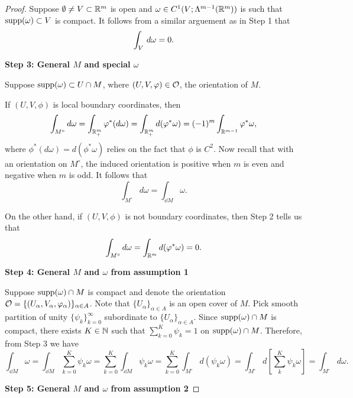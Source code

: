 \documentclass[a4paper]{article}
\renewcommand{\seqinfk}[1]{\{ #1 \}_{k=0}^\infty}
\renewcommand{\sumk}{\sum_{k=0}}
\begin{document}
\begin{proof}
  Suppose $\emptyset \neq V \subset \mathbb{R}^m$ is open and $\omega \in C^1 (V;
  \Lambda^{m-1} (\mathbb{R}^m))$ is such that $\operatorname{supp}(\omega) \subset V$ is
  compact. It follows from a similar arguement as in Step 1 that
  \[
    \int_V \, d \omega = 0.
  \]

  \textbf{Step 3: General $M$ and special $\omega$}

  Suppose $\operatorname{supp}(\omega) \subset U \cap M$, where $(U, V, \varphi) \in
  \mathcal{O}$, the orientation of $M$.

  If $(U, V, \phi)$ is local boundary coordinates, then
  \[
    \int_{M^\circ} d \omega
    = \int_{\mathbb{R}^m_+} \varphi^* (d \omega)
    = \int_{\mathbb{R}^m_+} d (\varphi^* \omega)
    = (-1)^m \int_{\mathbb{R}^{m-1}} \varphi^* \omega,
  \]
  where $\phi^* (d \omega) = d (\phi^* \omega)$ relies on the fact that
  $\phi$ is $C^2$. Now recall that with an orientation on $M^\circ$, the
  induced orientation is positive when $m$ is even and negative when $m$
  is odd. It follows that
  \[
    \int_{M^\circ} d \omega = \int_{\dd M} \omega.
  \]

  On the other hand, if $(U, V, \phi)$ is not boundary coordinates, then
  Step 2 tells us that
  \[
    \int_{M^\circ} d \omega = \int_{\mathbb{R}^m} d (\varphi^* \omega) = 0.
  \]

  \textbf{Step 4: General $M$ and $\omega$ from assumption 1}

  Suppose $\operatorname{supp}(\omega) \cap M$ is compact and denote the orientation
  $\mathcal{O} = \{(U_\alpha, V_\alpha, \varphi_\alpha)\}_{\alpha \in A}$. Note
  that $\{U_\alpha\}_{\alpha \in A}$ is an open cover of $M$. Pick smooth
  partition of unity $\seqinfk{\psi_k}$ subordinate to
  $\{U_\alpha\}_{\alpha \in A}$. Since $\operatorname{supp}(\omega) \cap M$ is compact,
  there exists $K \in \mathbb{N}$ such that $\sumk^K \psi_k = 1$ on $\operatorname{supp}(\omega)
  \cap M$. Therefore, from Step 3 we have
  \[
    \int_{\dd M} \omega
    = \int_{\dd M} \sumk^K \psi_k \omega
    = \sumk^K \int_{\dd M} \psi_k \omega
    = \sumk^K \int_{M^\circ} d (\psi_k \omega)
    = \int_{M^\circ} d \left[ \sum_k^K \psi_k \omega \right]
    = \int_{M^\circ} d \omega.
  \]

  \textbf{Step 5: General $M$ and $\omega$ from assumption 2}


\end{proof}
\end{document}
